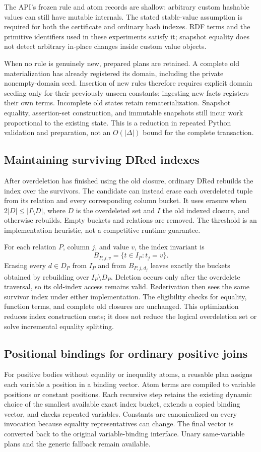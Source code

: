 The API's frozen rule and atom records are shallow: arbitrary custom hashable
values can still have mutable internals. The stated stable-value assumption is
required for both the certificate and ordinary hash indexes. RDF terms and the
primitive identifiers used in these experiments satisfy it; snapshot equality
does not detect arbitrary in-place changes inside custom value objects.

When no rule is genuinely new, prepared plans are retained. A complete old
materialization has already registered its domain, including the private
nonempty-domain seed. Insertion of new rules therefore requires explicit
domain seeding only for their previously unseen constants; ingesting new facts
registers their own terms. Incomplete old states retain rematerialization.
Snapshot equality, assertion-set construction, and immutable snapshots still
incur work proportional to the existing state. This is a reduction in repeated
Python validation and preparation, not an $O(|\Delta|)$ bound for the complete
transaction.

\subsection{Maintaining surviving DRed indexes}
After overdeletion has finished using the old closure, ordinary DRed rebuilds
the index over the survivors. The candidate can instead erase each overdeleted
tuple from its relation and every corresponding column bucket. It uses erasure
when $2|D|\leq|I\setminus D|$, where $D$ is the overdeleted set and $I$ the old
indexed closure, and otherwise rebuilds. Empty buckets and relations are
removed. The threshold is an implementation heuristic, not a competitive
runtime guarantee.

For each relation $P$, column $j$, and value $v$, the index invariant is
\[
 B_{P,j,v}=\{t\in I_P:t_j=v\}.
\]
Erasing every $d\in D_P$ from $I_P$ and from $B_{P,j,d_j}$ leaves exactly the
buckets obtained by rebuilding over $I_P\setminus D_P$. Deletion occurs only
after the overdelete traversal, so its old-index access remains valid.
Rederivation then sees the same survivor index under either implementation.
The eligibility checks for equality, function terms, and complete old closures
are unchanged. This optimization reduces index construction costs; it does not
reduce the logical overdeletion set or solve incremental equality splitting.

\subsection{Positional bindings for ordinary positive joins}
For positive bodies without equality or inequality atoms, a reusable plan
assigns each variable a position in a binding vector. Atom terms are compiled
to variable positions or constant positions. Each recursive step retains the
existing dynamic choice of the smallest available exact index bucket, extends
a copied binding vector, and checks repeated variables. Constants are
canonicalized on every invocation because equality representatives can change.
The final vector is converted back to the original variable-binding interface.
Unary same-variable plans and the generic fallback remain available.

